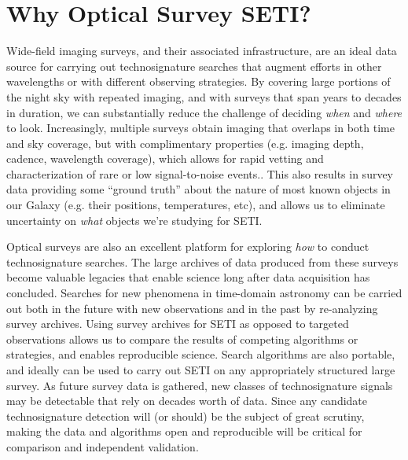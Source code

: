\documentclass[twocolumn]{aastex62}
\begin{document}

\section{Why Optical Survey SETI?}
\label{sec:method}

Wide-field imaging surveys, and their associated infrastructure, are an ideal data source for carrying out technosignature searches that augment efforts in other wavelengths or with different observing strategies. By covering large portions of the night sky with repeated imaging, and with surveys that span years to decades in duration, we can substantially reduce the challenge of deciding {\it when} and {\it where} to look. Increasingly, multiple surveys obtain imaging that overlaps in both time and sky coverage, but with complimentary properties (e.g. imaging depth, cadence, wavelength coverage), which allows for rapid vetting and characterization of rare or low signal-to-noise events.. This also results in survey data providing some ``ground truth'' about the nature of most known objects in our Galaxy (e.g. their positions, temperatures, etc), and allows us to eliminate uncertainty on {\it what} objects we're studying for SETI.

Optical surveys are also an excellent platform for exploring {\it how} to conduct technosignature searches. The large archives of data produced from these surveys become valuable legacies that enable science long after data acquisition has concluded. Searches for new phenomena in time-domain astronomy can be carried out both in the future with new observations and in the past by re-analyzing survey archives. 
Using survey archives for SETI as opposed to targeted observations allows us to compare the results of competing algorithms or strategies, and enables reproducible science. Search algorithms are also portable, and ideally can be used to carry out SETI on any appropriately structured large survey.
As future survey data is gathered, new classes of technosignature signals may be detectable that rely on decades worth of data. 
Since any candidate technosignature detection will (or should) be the subject of great scrutiny, making the data and algorithms open and reproducible will be critical for comparison and independent validation. 
\end{document}
